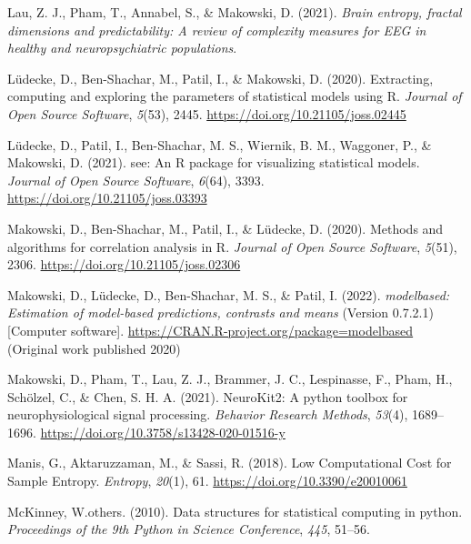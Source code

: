 \documentclass[
  man]{apa6}
\newlength{\cslhangindent}
\newlength{\cslentryspacingunit} %
\newenvironment{CSLReferences}[2] %
 {%
  \setlength{\parindent}{0pt}
  \ifodd #1
  \let\oldpar\par
  \def\par{\hangindent=\cslhangindent\oldpar}
  \fi
  \setlength{\parskip}{#2\cslentryspacingunit}
 }%
 {}
\begin{document}
\begin{CSLReferences}{1}{0}
\leavevmode{}%
Lau, Z. J., Pham, T., Annabel, S., \& Makowski, D. (2021). \emph{Brain entropy, fractal dimensions and predictability: A review of complexity measures for EEG in healthy and neuropsychiatric populations}.

\leavevmode{}%
Lüdecke, D., Ben-Shachar, M., Patil, I., \& Makowski, D. (2020). Extracting, computing and exploring the parameters of statistical models using {R}. \emph{Journal of Open Source Software}, \emph{5}(53), 2445. \url{https://doi.org/10.21105/joss.02445}

\leavevmode{}%
Lüdecke, D., Patil, I., Ben-Shachar, M. S., Wiernik, B. M., Waggoner, P., \& Makowski, D. (2021). {see}: An {R} package for visualizing statistical models. \emph{Journal of Open Source Software}, \emph{6}(64), 3393. \url{https://doi.org/10.21105/joss.03393}

\leavevmode{}%
Makowski, D., Ben-Shachar, M., Patil, I., \& Lüdecke, D. (2020). Methods and algorithms for correlation analysis in {R}. \emph{Journal of Open Source Software}, \emph{5}(51), 2306. \url{https://doi.org/10.21105/joss.02306}

\leavevmode{}%
Makowski, D., Lüdecke, D., Ben-Shachar, M. S., \& Patil, I. (2022). \emph{{modelbased}: Estimation of model-based predictions, contrasts and means} (Version 0.7.2.1) {[}Computer software{]}. \url{https://CRAN.R-project.org/package=modelbased} (Original work published 2020)

\leavevmode{}%
Makowski, D., Pham, T., Lau, Z. J., Brammer, J. C., Lespinasse, F., Pham, H., Schölzel, C., \& Chen, S. H. A. (2021). {NeuroKit}2: A python toolbox for neurophysiological signal processing. \emph{Behavior Research Methods}, \emph{53}(4), 1689--1696. \url{https://doi.org/10.3758/s13428-020-01516-y}

\leavevmode{}%
Manis, G., Aktaruzzaman, M., \& Sassi, R. (2018). Low Computational Cost for Sample Entropy. \emph{Entropy}, \emph{20}(1), 61. \url{https://doi.org/10.3390/e20010061}

\leavevmode{}%
McKinney, W.others. (2010). Data structures for statistical computing in python. \emph{Proceedings of the 9th Python in Science Conference}, \emph{445}, 51--56.


\end{CSLReferences}
\end{document}
